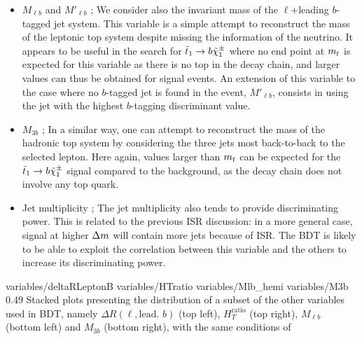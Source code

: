 \begin{itemize}
            compared to the total hadronic activity of the event, $H_T$. Because the visible
            energy recoils on the LSP in signal events, this variable tends to have low values
            for signal while being around 0.5 for background.
        \item $M_{\ell b}$ and $M'_{\ell b}$ ; We consider also the invariant mass of the
            $\ell$+leading $b$-tagged jet system. This variable is a simple attempt to
            reconstruct the mass of the leptonic top system despite missing the information
            of the neutrino. It appears to be useful in the search for $\tilde{t}_1 \rightarrow
            b \tilde{\chi}_1^\pm$ where no end point at $m_{t}$ is expected for this variable as there
            is no top in the decay chain, and larger values can thus be obtained for signal events.
            An extension of this variable to the case where no $b$-tagged jet is found in the event,
            $M'_{\ell b}$, consists in using the jet with the highest $b$-tagging discriminant
            value.
        \item $M_{3b}$ ; In a similar way, one can attempt to reconstruct the mass of the
            hadronic top system by considering the three jets most back-to-back to the selected
            lepton. Here again, values larger than $m_{t}$ can be expected for the $\tilde{t}_1
            \rightarrow b \tilde{\chi}_1^\pm$ signal compared to the background, as the decay chain
            does not involve any top quark.
        \item Jet multiplicity ; The jet multiplicity also tends to provide discriminating power.
            This is related to the previous ISR discussion: in a more general case, signal
            at higher $\Delta m$ will contain more jets because of ISR. The BDT is likely to
            be able to exploit the correlation between this variable and the others to
            increase its discriminating power.
    \end{itemize}

                      {variables/deltaRLeptonB}
                      {variables/HTratio}
                      {variables/Mlb_hemi}
                      {variables/M3b}
                      {0.49}
                      {Stacked plots presenting the distribution of a subset of
                      the other variables used in BDT, namely $\Delta R( \ell, \text{lead. } b)$
                      (top left), $H_{T}^\text{ratio}$ (top right), $M_{\ell b}$ (bottom
                      left) and $M_{3b}$ (bottom right), with the same conditions of
                      }

